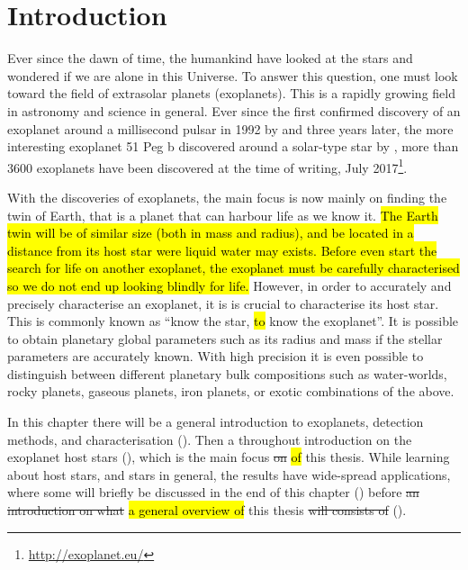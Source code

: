 \chapter{Introduction}
\label{cha:introduction}

Ever since the dawn of time, the humankind have looked at the stars and wondered if we are alone in
this Universe. To answer this question, one must look toward the field of extrasolar planets
(exoplanets). This is a rapidly growing field in astronomy and science in general. Ever since the
first confirmed discovery of an exoplanet around a millisecond pulsar in 1992 by
\citet{Wolszczan1992} and three years later, the more interesting exoplanet 51 Peg b discovered
around a solar-type star by \citet{Mayor1995}, more than 3600 exoplanets have been discovered at the
time of writing, July 2017\footnote{\url{http://exoplanet.eu/}}.

With the discoveries of exoplanets, the main focus is now mainly on finding the twin of Earth, that
is a planet that can harbour life as we know it. \hl{The Earth twin will be of similar size (both in
mass and radius), and be located in a distance from its host star were liquid water may exists.
Before even start the search for life on another exoplanet, the exoplanet must be carefully
characterised so we do not end up looking blindly for life.} However, in order to accurately and
precisely characterise an exoplanet, it is is crucial to characterise its host star. This is
commonly known as ``know the star, \hl{to} know the exoplanet''. It is possible to obtain planetary
global parameters such as its radius and mass if the stellar parameters are accurately known. With
high precision it is even possible to distinguish between different planetary bulk compositions such
as water-worlds, rocky planets, gaseous planets, iron planets, or exotic combinations of the above.

In this chapter there will be a general introduction to exoplanets, detection methods, and
characterisation (). Then a throughout introduction on the exoplanet host
stars (), which is the main focus \st{on} \hl{of} this thesis. While learning about
host stars, and stars in general, the results have wide-spread applications, where some will briefly
be discussed in the end of this chapter () before \st{an introduction on
what} \hl{a general overview of} this thesis \st{will consists of} ().



